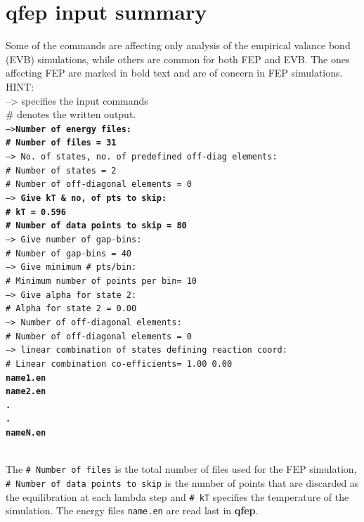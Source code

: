 \documentclass[10pt,oneside,pdftex]{article}
\begin{document}
\section{\textbf{qfep} input summary}

Some of the commands are affecting only analysis of the empirical
valance bond (EVB) simulations, while others are common for both
FEP and EVB. The ones affecting FEP are marked in bold text and
are of concern in FEP simulations.\\ 
HINT:\\ 
--> specifies the input commands \\
\# denotes the written output.\\


\noindent\texttt{-->\textbf{Number of energy files:\\
\# Number of files                 =    31}\\
--> No. of states, no. of predefined off-diag elements: \\
\# Number of states                 =     2\\
\# Number of off-diagonal elements =     0\\
--> \textbf{Give kT \& no, of pts to skip:}\\
\textbf{\# kT                              = 0.596}\\
\textbf{\# Number of data points to skip   =    80}\\
--> Give number of gap-bins: \\
\# Number of gap-bins              =    40\\
--> Give minimum \# pts/bin: \\
\# Minimum number of points per bin=    10\\
--> Give alpha for state  2:\\
\# Alpha for state  2              =  0.00\\
--> Number of off-diagonal elements:\\
\# Number of off-diagonal elements =     0\\
--> linear combination of states defining reaction coord: \\
\# Linear combination co-efficients=  1.00  0.00\\
\textbf{name1.en\\
name2.en\\
.\\
.\\
nameN.en\\}
}

The \texttt{\# Number of files} is the total number of files used
for the FEP simulation, \texttt{\# Number of data points to skip}
is the number of points that are discarded as the equilibration at
each lambda step and \texttt{\# kT} specifies the temperature of
the simulation. The energy files \texttt{name.en} are read last in
\textbf{qfep}.



\end{document}
